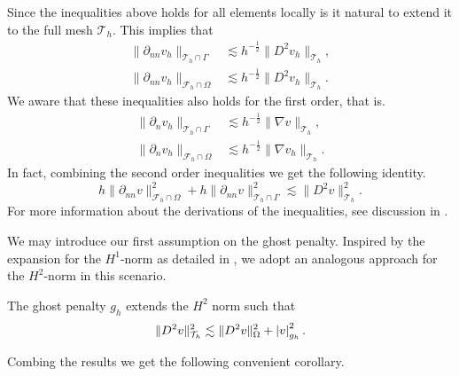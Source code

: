 Since the inequalities above holds for all elements locally is it natural to extend it to the full mesh  $\mathcal{T}_{h} $. This implies that
\begin{align}
\label{eq:bi_cut_inverse_1}
\| \partial _{nn} v_h \|_{ \mathcal{T} _{h} \cap \Gamma  }^{  } &\lesssim h^{-\frac{1}{2}} \| D^2 v_h \|_{ \mathcal{T}_h }^{  }, \\
\label{eq:bi_cut_inverse_2}
\| \partial _{nn}  v_h \|_{ \mathcal{F}_h \cap \Omega    }^{  }  &  \lesssim   h^{-\frac{1}{2}} \| D^2 v_h \|_{ \mathcal{T}_h  }^{  }.
\end{align}
    We aware that these inequalities also holds for the first order, that is.
\begin{align}
\label{eq:bi_n_cut_inverse_1}
\| \partial _{n} v_h \|_{ \mathcal{T} _{h} \cap \Gamma  }^{  } &\lesssim h^{-\frac{1}{2}} \| \nabla v \|_{ \mathcal{T}_h }^{  }, \\
\label{eq:bi_n_cut_inverse_2}
\| \partial _{n}  v_h \|_{ \mathcal{F}_h \cap \Omega    }^{  }  &  \lesssim   h^{-\frac{1}{2}} \| \nabla v_h \|_{ \mathcal{T}_h  }^{  }.
\end{align}
In fact, combining the second order inequalities we get the following identity.
\begin{equation}
\label{eq:bi_identity}
h\| \partial _{nn}  v \|_{ \mathcal{F}_h \cap \Omega    }^{2 } + h\| \partial _{nn} v \|_{ \mathcal{T} _{h} \cap \Gamma  }^{2  } \lesssim \| D^2 v \|_{ \mathcal{T} _{h}  }^{2  }.
\end{equation}
For more information about the derivations of the inequalities, see discussion in \cite[Section 2.4]{gurkan2019stabilized}.

We may introduce our first assumption on the ghost penalty.  Inspired by the expansion for the $H^{1}$-norm as detailed in \cite[Equation 2.23]{gurkan2019stabilized}, we adopt an analogous approach for the $H^{2}$-norm in this scenario.
\begin{assumption*}[EP1]
    \label{as:bi_EP1}
    The ghost penalty $g_{h}$ extends the $H^{2}$ norm such that
    \begin{equation*}
    \| D^2 v \|_{ \mathcal{T} _{h} }^{ 2 } \lesssim  \| D^2 v \|_{ \Omega  }^{ 2 } + \left\lvert  v  \right\rvert _{g_{h}}^{2}.
    \end{equation*}
\end{assumption*}


Combing the results we get the following convenient corollary.

